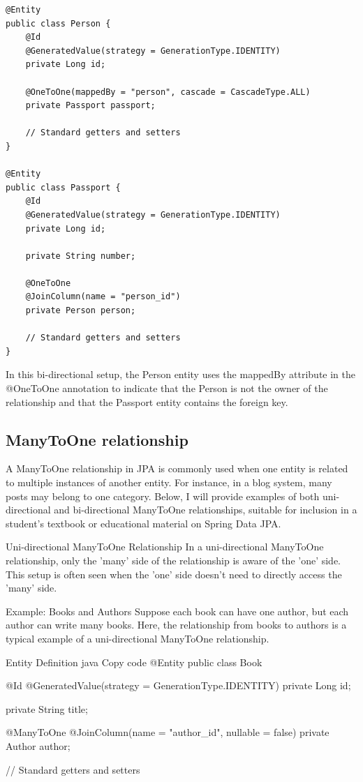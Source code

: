 \begin{lstlisting}
@Entity
public class Person {
    @Id
    @GeneratedValue(strategy = GenerationType.IDENTITY)
    private Long id;

    @OneToOne(mappedBy = "person", cascade = CascadeType.ALL)
    private Passport passport;

    // Standard getters and setters
}

@Entity
public class Passport {
    @Id
    @GeneratedValue(strategy = GenerationType.IDENTITY)
    private Long id;

    private String number;

    @OneToOne
    @JoinColumn(name = "person_id")
    private Person person;

    // Standard getters and setters
}
\end{lstlisting}

In this bi-directional setup, the Person entity uses the mappedBy attribute in the @OneToOne annotation to indicate that the Person is not the owner of the relationship and that the Passport entity contains the foreign key.

\subsection{ManyToOne relationship}

A ManyToOne relationship in JPA is commonly used when one entity is related to multiple instances of another entity. For instance, in a blog system, many posts may belong to one category. Below, I will provide examples of both uni-directional and bi-directional ManyToOne relationships, suitable for inclusion in a student's textbook or educational material on Spring Data JPA.

Uni-directional ManyToOne Relationship
In a uni-directional ManyToOne relationship, only the 'many' side of the relationship is aware of the 'one' side. This setup is often seen when the 'one' side doesn't need to directly access the 'many' side.

Example: Books and Authors
Suppose each book can have one author, but each author can write many books. Here, the relationship from books to authors is a typical example of a uni-directional ManyToOne relationship.

Entity Definition
java
Copy code
@Entity
public class Book {
    @Id
    @GeneratedValue(strategy = GenerationType.IDENTITY)
    private Long id;

    private String title;

    @ManyToOne
    @JoinColumn(name = "author_id", nullable = false)
    private Author author;

    // Standard getters and setters
}

